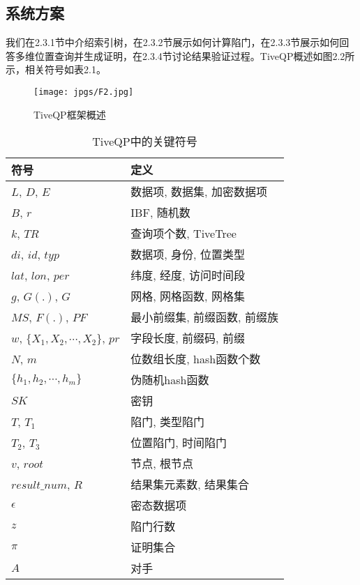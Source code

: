 \documentclass{cumcmthesis}
\numberwithin{equation}{section} %
\numberwithin{figure}{section} %
\numberwithin{table}{section} %
\begin{document}
\subsection{系统方案}

我们在2.3.1节中介绍索引树，在2.3.2节展示如何计算陷门，在2.3.3节展示如何回答多维位置查询并生成证明，在2.3.4节讨论结果验证过程。TiveQP概述如图2.2所示，相关符号如表2.1。

\begin{figure}[H]
    \centering
    \texttt{[image: jpgs/F2.jpg]}
    \caption{TiveQP框架概述}
    \label{fig:tiveqp_framework}
\end{figure}

\begin{table}[h]
    \centering
    \begin{tabular}{ll}
        \toprule
        符号 & 定义 \\
        \midrule
        \(L\), \(D\), \(E\) & 数据项, 数据集, 加密数据项 \\
        \(B\), \(r\) & IBF, 随机数 \\
        \(k\), \(TR\) & 查询项个数, TiveTree \\
        \(di\), \(id\), \(typ\) & 数据项, 身份, 位置类型 \\
        \(lat\), \(lon\), \(per\) & 纬度, 经度, 访问时间段 \\
        \(g\), \(G(.)\), \(G\) & 网格, 网格函数, 网格集 \\
        \(MS\), \(F(.)\), \(PF\) & 最小前缀集, 前缀函数, 前缀族 \\
        \(w\), \(\{X_1, X_2, \cdots, X_2\}\), \(pr\) & 字段长度, 前缀码, 前缀 \\
        \(N\), \(m\) & 位数组长度, hash函数个数 \\
        \(\{h_1, h_2, \cdots, h_m\}\) & 伪随机hash函数 \\
        \(SK\) & 密钥 \\
        \(T\), \(T_1\) & 陷门, 类型陷门 \\
        \(T_2\), \(T_3\) & 位置陷门, 时间陷门 \\
        \(v\), \(root\) & 节点, 根节点 \\
        \(result\_num\), \(R\) & 结果集元素数, 结果集合 \\
        \(\epsilon\) & 密态数据项 \\
        \(z\) & 陷门行数 \\
        \(\pi\) & 证明集合 \\
        \(A\) & 对手 \\
        \bottomrule
    \end{tabular}
    \caption{TiveQP中的关键符号}
\end{table}
\end{document}
